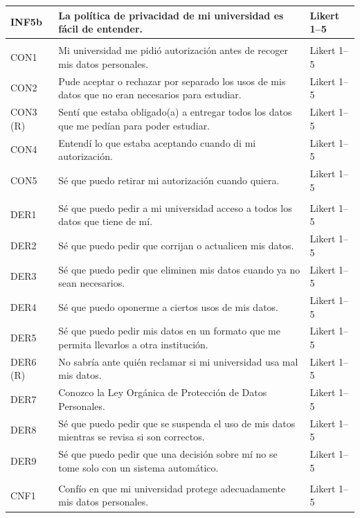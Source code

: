 {\begin{xltabular}{\textwidth}{|>{\raggedright\arraybackslash}p{1.1cm}|>{\raggedright\arraybackslash}X|>{\raggedright\arraybackslash}p{4.6cm}|}
  INF5b & La política de privacidad de mi universidad es fácil de entender. & Likert 1--5 \\ \hline
   \\ \hline
  CON1 & Mi universidad me pidió autorización antes de recoger mis datos personales. & Likert 1--5 \\ \hline
  CON2 & Pude aceptar o rechazar por separado los usos de mis datos que no eran necesarios para estudiar. & Likert 1--5 \\ \hline
  CON3 (R) & Sentí que estaba obligado(a) a entregar todos los datos que me pedían para poder estudiar. & Likert 1--5 \\ \hline
  CON4 & Entendí lo que estaba aceptando cuando di mi autorización. & Likert 1--5 \\ \hline
  CON5 & Sé que puedo retirar mi autorización cuando quiera. & Likert 1--5 \\ \hline
   \\ \hline
  DER1 & Sé que puedo pedir a mi universidad acceso a todos los datos que tiene de mí. & Likert 1--5 \\ \hline
  DER2 & Sé que puedo pedir que corrijan o actualicen mis datos. & Likert 1--5 \\ \hline
  DER3 & Sé que puedo pedir que eliminen mis datos cuando ya no sean necesarios. & Likert 1--5 \\ \hline
  DER4 & Sé que puedo oponerme a ciertos usos de mis datos. & Likert 1--5 \\ \hline
  DER5 & Sé que puedo pedir mis datos en un formato que me permita llevarlos a otra institución. & Likert 1--5 \\ \hline
  DER6 (R) & No sabría ante quién reclamar si mi universidad usa mal mis datos. & Likert 1--5 \\ \hline
  DER7 & Conozco la Ley Orgánica de Protección de Datos Personales. & Likert 1--5 \\ \hline
  DER8 & Sé que puedo pedir que se suspenda el uso de mis datos mientras se revisa si son correctos. & Likert 1--5 \\ \hline
  DER9 & Sé que puedo pedir que una decisión sobre mí no se tome solo con un sistema automático. & Likert 1--5 \\ \hline
   \\ \hline
  CNF1 & Confío en que mi universidad protege adecuadamente mis datos personales. & Likert 1--5 \\ \hline

\end{xltabular}}
